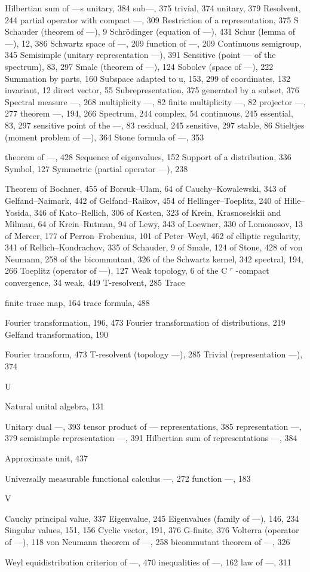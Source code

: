 Hilbertian sum of ---s unitary, 384 sub---, 375 trivial, 374 unitary, 379 Resolvent, 244 partial operator with compact ---, 309 Restriction of a representation, 375 S Schauder (theorem of ---), 9 Schrödinger (equation of ---), 431 Schur (lemma of ---), 12, 386 Schwartz space of ---, 209 function of ---, 209 Continuous semigroup, 345 Semisimple (unitary representation ---), 391 Sensitive (point --- of the spectrum), 83, 297 Smale (theorem of ---), 124 Sobolev (space of ---), 222 Summation by parts, 160 Subspace adapted to u, 153, 299 of coordinates, 132 invariant, 12 direct vector, 55 Subrepresentation, 375 generated by a subset, 376 Spectral measure ---, 268 multiplicity ---, 82 finite multiplicity ---, 82 projector ---, 277 theorem ---, 194, 266 Spectrum, 244 complex, 54 continuous, 245 essential, 83, 297 sensitive point of the ---, 83 residual, 245 sensitive, 297 stable, 86 Stieltjes (moment problem of ---), 364 Stone formula of ---, 353

theorem of ---, 428 Sequence of eigenvalues, 152 Support of a distribution, 336 Symbol, 127 Symmetric (partial operator ---), 238


Theorem of Bochner, 455 of Borsuk--Ulam, 64 of Cauchy--Kowalewski, 343 of Gelfand--Naimark, 442 of Gelfand--Raikov, 454 of Hellinger--Toeplitz, 240 of Hille--Yosida, 346 of Kato--Rellich, 306 of Kesten, 323 of Krein, Krasnoselskii and Milman, 64 of Krein--Rutman, 94 of Lewy, 343 of Loewner, 330 of Lomonosov, 13 of Mercer, 177 of Perron--Frobenius, 101 of Peter--Weyl, 462 of elliptic regularity, 341 of Rellich--Kondrachov, 335 of Schauder, 9 of Smale, 124 of Stone, 428 of von Neumann, 258 of the bicommutant, 326 of the Schwartz kernel, 342 spectral, 194, 266 Toeplitz (operator of ---), 127 Weak topology, 6 of the C \(^{r}\) -compact convergence, 34 weak, 449 T-resolvent, 285 Trace

finite trace map, 164 trace formula, 488

Fourier transformation, 196, 473 Fourier transformation of distributions, 219 Gelfand transformation, 190

Fourier transform, 473 T-resolvent (topology ---), 285 Trivial (representation ---), 374

U

Natural unital algebra, 131

Unitary dual ---, 393 tensor product of --- representations, 385 representation ---, 379 semisimple representation ---, 391 Hilbertian sum of representations ---, 384

Approximate unit, 437

Universally measurable functional calculus ---, 272 function ---, 183

V

Cauchy principal value, 337 Eigenvalue, 245 Eigenvalues (family of ---), 146,
234
Singular values, 151, 156 Cyclic vector, 191, 376 G-finite, 376 Volterra (operator of ---), 118 von Neumann theorem of ---, 258 bicommutant theorem of ---,
326

Weyl equidistribution criterion of ---, 470 inequalities of ---, 162 law of ---, 311

